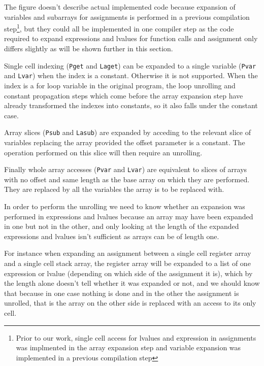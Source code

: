 \documentclass{article}
\begin{document}
The figure doesn't describe actual implemented code because expansion of
variables and subarrays for assignments is performed in a previous compilation
step\footnote{Prior to our work, single cell access for lvalues and expression
in assignments was implmented in the array expansion step and variable expansion
was implemented in a previous compilation step}, but they could all be
implemented in one compiler step as the code required to expand expressions and
lvalues for function calls and assignment only differs slightly as will be shown
further in this section.

\smallskip

Single cell indexing (\texttt{Pget} and \texttt{Laget}) can be expanded to a
single variable (\texttt{Pvar} and \texttt{Lvar}) when the index is a constant.
Otherwise it is not supported. When the index is a for loop variable in the
original program, the loop unrolling and constant propagation steps which come
before the array expansion step have already transformed the indexes into
constants, so it also falls under the constant case.

Array slices (\texttt{Psub} and \texttt{Lasub}) are expanded by acceding to
the relevant slice of variables replacing the array provided the offset
parameter is a constant. The operation performed on this slice will then require
an unrolling.

Finally whole array accesses (\texttt{Pvar} and \texttt{Lvar}) are equivalent to
slices of arrays with no offset and same length as the base array on which they
are performed. They are replaced by all the variables the array is to be
replaced with.

\smallskip

In order to perform the unrolling we need to know whether an expansion was
performed in expressions and lvalues because an array may have been expanded in
one but not in the other, and only looking at the length of the expanded
expressions and lvalues isn't sufficient as arrays can be of length one.

For instance when expanding an assignment between a single cell register array
and a single cell stack array, the register array will be expanded to a list of
one expression or lvalue (depending on which side of the assignment it is),
which by the length alone doesn't tell whether it was expanded or not, and we
should know that because in one case nothing is done and in the other the
assignment is unrolled, that is the array on the other side is replaced with an
access to its only cell.
\end{document}
